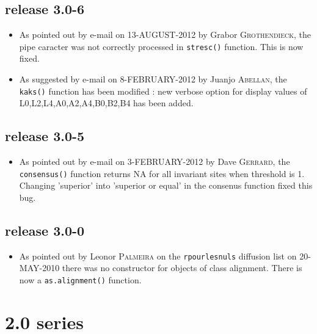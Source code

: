 \documentclass{article}
\begin{document}
\subsection*{release 3.0-6}


\begin{itemize}

\item As pointed out by e-mail on 13-AUGUST-2012 by Grabor \textsc{Grothendieck}, the pipe caracter was not correctly processed in \texttt{stresc()} function. This is now fixed.


\item As suggested by e-mail on 8-FEBRUARY-2012 by Juanjo \textsc{Abellan}, the   \texttt{kaks()}  function has been modified : new  verbose option for  display  values of L0,L2,L4,A0,A2,A4,B0,B2,B4 has been added. 

\end{itemize}

\subsection*{release 3.0-5}
\begin{itemize}

\item As pointed out by e-mail on 3-FEBRUARY-2012 by Dave \textsc{Gerrard}, the \texttt{consensus()}  function returns NA for all invariant sites when threshold is 1.  Changing  'superior' into 'superior or equal' in the consenus function fixed this bug.

\end{itemize}



\subsection*{release 3.0-0}

\begin{itemize}

\item As pointed out by Leonor \textsc{Palmeira} on the \texttt{rpourlesnuls} diffusion list on 20-MAY-2010 there was no constructor for objects
of class alignment. There is now a \texttt{as.alignment()} function.

\end{itemize}

\section*{2.0 series}
\end{document}
